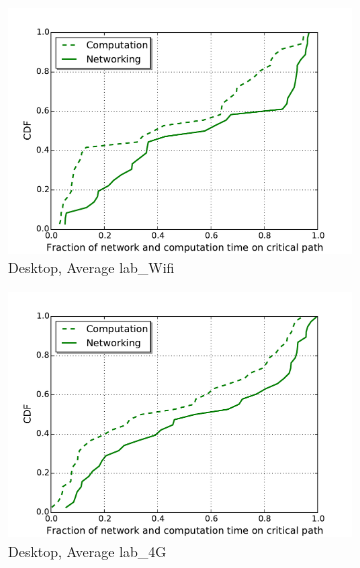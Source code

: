 \begin{figure}[!htb]
    \begin{subfigure}{0.48\textwidth}
        \includegraphics[width=1\linewidth]{./figures/computation/desktop-b20-d50.pdf}
        \caption{Desktop, Average lab\_Wifi}
        \label{fig:non-mobile-b20-d50}
    \end{subfigure}%
    \begin{subfigure}{0.48\textwidth}
        \includegraphics[width=1\linewidth]{./figures/computation/desktop-b5-d50.pdf}
        \caption{Desktop, Average lab\_4G}
        \label{fig:non-mobile-b5-d50}
    \end{subfigure}
   \begin{subfigure}{0.48\textwidth}

\end{subfigure}
\end{figure}
